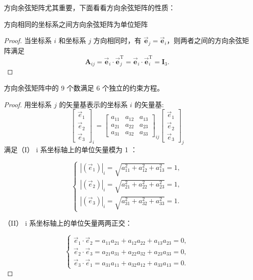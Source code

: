 方向余弦矩阵尤其重要，下面看看方向余弦矩阵的性质：
\begin{property}[性质一]\label{prop:dcm-identity}
	方向相同的坐标系之间方向余弦矩阵为单位矩阵
\end{property}
\begin{proof}
	当坐标系 $i$ 和坐标系 $j$ 方向相同时，有 $\vec{\boldsymbol{e}}_j=\vec{\boldsymbol{e}}_i$，则两者之间的方向余弦矩阵满足
	$$
	\boldsymbol{A}_{ij}=\vec{\boldsymbol{e}}_{i} \cdot \vec{\boldsymbol{e}}_{j}^{\mathrm{T}}=\vec{\boldsymbol{e}}_{i} \cdot \vec{\boldsymbol{e}}_{i}^{\mathrm{T}}=\boldsymbol{I}_3.
	$$
\end{proof}

\begin{property}[性质二]\label{prop:dcm-constraint}
	方向余弦矩阵中的 9 个数满足 6 个独立的约束方程。
\end{property}
\begin{proof}
	用坐标系 $j$ 的矢量基表示的坐标系 $i$ 的矢量基:
	$$\begin{bmatrix}\vec{e}_1\\\vec{e}_2\\\vec{e}_3\end{bmatrix}_i=\begin{bmatrix}a_{11}&a_{12}&a_{13}\\a_{21}&a_{22}&a_{23}\\a_{31}&a_{32}&a_{33}\end{bmatrix}_{ij}\begin{bmatrix}\vec{e}_1\\\vec{e}_2\\\vec{e}_3\end{bmatrix}_j$$
	满足（I） i  系坐标轴上的单位矢量模为 1 ：
	
	$$\left\{\begin{array}{l}
		\left|\left(\vec{e}_{1}\right)\right|_{i}=\sqrt{a_{11}^{2}+a_{12}^{2}+a_{13}^{2}}=1, \\
		\left|\left(\vec{e}_{2}\right)\right|_{i}=\sqrt{a_{21}^{2}+a_{22}^{2}+a_{23}^{2}}=1, \\
		\left|\left(\vec{e}_{3}\right)\right|_{i}=\sqrt{a_{31}^{2}+a_{32}^{2}+a_{33}^{2}}=1 .
	\end{array}\right.$$
	
	（II） i  系坐标轴上的单位矢量两两正交：
	
	$$\left\{\begin{array}{l}
		\vec{e}_{1}\cdot\vec{e}_{2}=a_{11} a_{21}+a_{12} a_{22}+a_{13} a_{23}=0, \\
		\vec{e}_{2}\cdot\vec{e}_{3}=a_{21} a_{31}+a_{22} a_{32}+a_{23} a_{33}=0, \\
		\vec{e}_{3}\cdot\vec{e}_{1}=a_{31} a_{11}+a_{32} a_{12}+a_{33} a_{13}=0 .
	\end{array}\right.$$
	
\end{proof}

